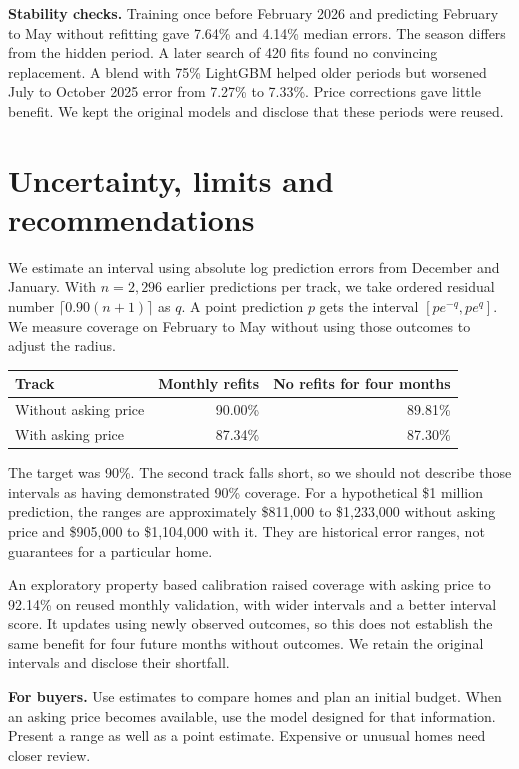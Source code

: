 \documentclass[10pt]{article}
\begin{document}
\textbf{Stability checks.} Training once before February 2026 and predicting February to May without refitting gave 7.64\% and 4.14\% median errors. The season differs from the hidden period. A later search of 420 fits found no convincing replacement. A blend with 75\% LightGBM helped older periods but worsened July to October 2025 error from 7.27\% to 7.33\%. Price corrections gave little benefit. We kept the original models and disclose that these periods were reused.

\newpage
\section{Uncertainty, limits and recommendations}
We estimate an interval using absolute log prediction errors from December and January. With $n=2,296$ earlier predictions per track, we take ordered residual number $\lceil0.90(n+1)\rceil$ as $q$. A point prediction $p$ gets the interval $[p e^{-q},p e^q]$. We measure coverage on February to May without using those outcomes to adjust the radius.

\begin{center}
\begin{tabular}{lrr}
\toprule
Track & Monthly refits & No refits for four months\\
\midrule
Without asking price & 90.00\% & 89.81\%\\
With asking price & 87.34\% & 87.30\%\\
\bottomrule
\end{tabular}
\end{center}
The target was 90\%. The second track falls short, so we should not describe those intervals as having demonstrated 90\% coverage. For a hypothetical \$1 million prediction, the ranges are approximately \$811,000 to \$1,233,000 without asking price and \$905,000 to \$1,104,000 with it. They are historical error ranges, not guarantees for a particular home.

An exploratory property based calibration raised coverage with asking price to 92.14\% on reused monthly validation, with wider intervals and a better interval score. It updates using newly observed outcomes, so this does not establish the same benefit for four future months without outcomes. We retain the original intervals and disclose their shortfall.

\textbf{For buyers.} Use estimates to compare homes and plan an initial budget. When an asking price becomes available, use the model designed for that information. Present a range as well as a point estimate. Expensive or unusual homes need closer review.
\end{document}

